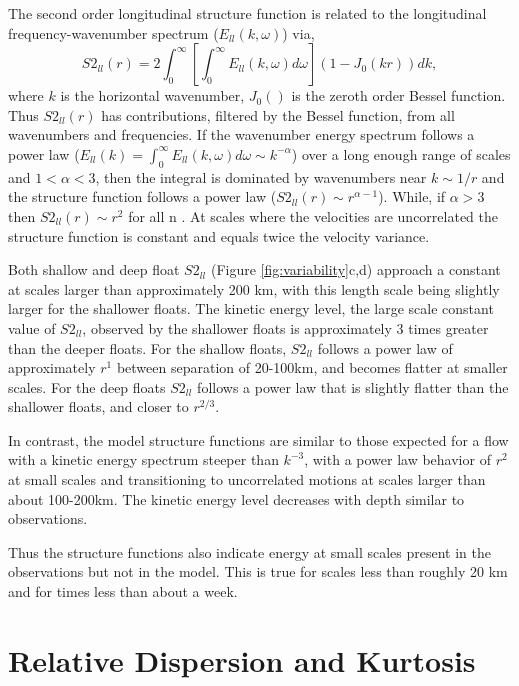 \documentclass[]{ametsoc}
\begin{document}
The second order longitudinal structure function is related to the longitudinal frequency-wavenumber spectrum ($E_{ll}(k, \omega)$) via, 
\begin{equation}
    S2_{ll}(r) = 2\int_0^\infty \left[ \int_0^\infty E_{ll}(k, \omega) d\omega \right] (1- J_0(kr)) dk, 
    \label{eqn:S2}
\end{equation}
where $k$ is the horizontal wavenumber, $J_0()$ is the zeroth order Bessel function. Thus $S2_{ll}(r)$ has contributions, filtered by the Bessel function, from all wavenumbers and frequencies.
If the wavenumber energy spectrum follows a power law ($E_{ll}(k) = \int_0^\infty E_{ll}(k, \omega) d\omega \sim k^{-\alpha}$) over a long enough range of scales and $1<\alpha<3$, then the integral is dominated by wavenumbers near $k \sim 1/r$  and the structure function follows a power law ($S2_{ll}(r)\sim r^{\alpha-1}$). While, if $\alpha>3$ then $S2_{ll}(r)\sim r^{2}$ for all n \citep{bennett1984relative, balwada2016b}. At scales where the velocities are uncorrelated the structure function is constant and equals twice the velocity variance.

Both shallow and deep float $S2_{ll}$ (Figure \ref{fig:variability}c,d) approach a constant at scales larger than approximately 200 km, with this length scale being slightly larger for the shallower floats. The kinetic energy level, the large scale constant value of $S2_{ll}$, observed by the shallower floats is approximately 3 times greater than the deeper floats. For the shallow floats, $S2_{ll}$ follows a power law of approximately $r^1$ between separation of 20-100km, and becomes flatter at smaller scales. For the deep floats $S2_{ll}$ follows a power law that is slightly flatter than the shallower floats, and closer to $r^{2/3}$. 

In contrast, the model structure functions are similar to those expected 
for a flow with a kinetic energy spectrum steeper than $k^{-3}$, with a power law behavior of $r^{2}$ at small scales and transitioning to uncorrelated motions at scales larger than about 100-200km. The kinetic energy level decreases with depth similar to observations.

Thus the structure functions also indicate energy at small scales present in the observations but not in the model. This is true for scales less than roughly 20 km and for times less than about a week.

\section{Relative Dispersion and Kurtosis}
\end{document}
